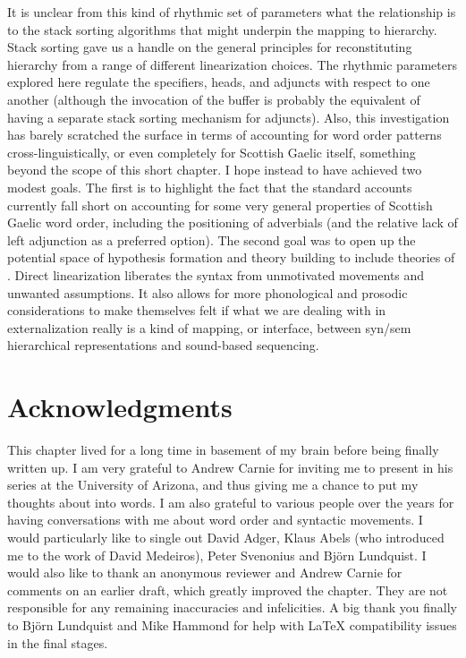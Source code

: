 \documentclass[output=paper,colorlinks,citecolor=brown]{langscibook}
\begin{document}
It is unclear from this kind of rhythmic set of parameters what the relationship is to the stack sorting algorithms that might underpin the mapping to hierarchy. Stack sorting gave us a handle on the general principles for reconstituting hierarchy from a range of different linearization choices. The rhythmic parameters explored here regulate the specifiers, heads, and adjuncts with respect to one another (although the invocation of the buffer is probably the equivalent of having a separate stack sorting mechanism for adjuncts). Also, this investigation has barely scratched the surface in terms of accounting for word order patterns cross-linguistically, or even completely for Scottish Gaelic itself, something beyond the scope of this short chapter.  I hope instead to have achieved two modest goals. The first is to highlight the fact that the standard accounts currently fall short on accounting for some very general properties of Scottish Gaelic word order, including the positioning of adverbials (and the relative lack of left adjunction as a preferred option).  The second goal was to open up the potential space of hypothesis formation and theory building to include theories of . Direct linearization liberates the syntax from unmotivated movements and unwanted assumptions. It also allows for more phonological and prosodic considerations to make themselves felt if what we are dealing with in externalization really is a kind of mapping, or interface, between syn/sem hierarchical representations and sound-based sequencing.


 
\section*{Acknowledgments}
This chapter lived for a long time in basement of my brain before being finally written up. I am very grateful to Andrew Carnie for inviting me to present in his series at the University of Arizona, and thus giving me a chance to put my thoughts about  into words. I am also grateful to various people over the years for having conversations with me about word order and syntactic movements. I would particularly like to single out David Adger, Klaus Abels (who introduced me to the work of David Medeiros), Peter Svenonius and Björn Lundquist.  I would also like to thank an anonymous reviewer and Andrew Carnie for comments on an earlier draft, which greatly improved the chapter.  They are not responsible for any  remaining inaccuracies and infelicities.   A big thank you finally to Björn Lundquist and Mike Hammond for help with \LaTeX{} compatibility issues in the final stages.


\printbibliography[heading=subbibliography,notkeyword=this]
\end{document}
